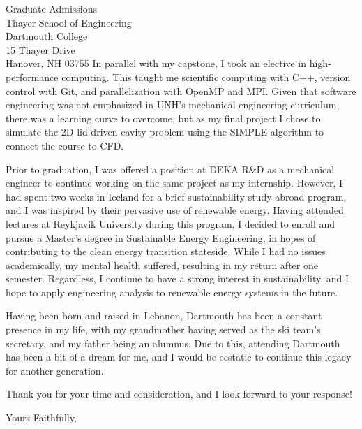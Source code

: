 \documentclass{letter}
\begin{document}
\begin{letter}{Graduate Admissions \\ Thayer School of Engineering \\ Dartmouth College \\ 15 Thayer Drive \\ Hanover, NH 03755}
    In parallel with my capstone, I took an elective in high-performance computing. This taught me scientific computing with C++, version 
    control with Git, and parallelization with OpenMP and MPI. Given that software engineering was not emphasized in UNH's 
    mechanical engineering curriculum, there was a learning curve to overcome, but as my final project I chose to simulate the 2D lid-driven 
    cavity problem using the SIMPLE algorithm to connect the course to CFD.

    Prior to graduation, I was offered a position at DEKA R\&D as a mechanical engineer to continue working on the same project as
    my internship. However, I had spent two weeks in Iceland for a brief sustainability study abroad program, and I was inspired by their
    pervasive use of renewable energy. Having attended lectures at Reykjavik University during this program, I decided to enroll  
    and pursue a Master's degree in Sustainable Energy Engineering, in hopes of contributing to the clean energy transition stateside. 
    While I had no issues academically, my mental health suffered, resulting in my return after one semester. Regardless, I continue to have
    a strong interest in sustainability, and I hope to apply engineering analysis to renewable energy systems in the future.

    Having been born and raised in Lebanon, Dartmouth has been a constant presence in my life, with my grandmother having served as 
    the ski team's secretary, and my father being an alumnus. Due to this, attending Dartmouth has been a bit 
    of a dream for me, and I would be ecstatic to continue this legacy for another generation.

    Thank you for your time and consideration, and I look forward to your response!

    \closing{Yours Faithfully,}

\end{letter}
\end{document}
